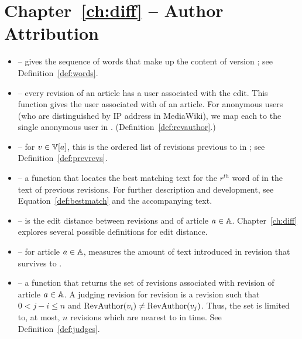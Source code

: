 \section{Chapter~\ref{ch:diff} -- Author Attribution}

\begin{itemize}

\item \words{\version{}} -- gives the sequence of words that make
    up the content of version \version{}; see
    Definition~\ref{def:words}.

\item \revauthor{\version{}} -- every revision of an article has
    a user associated with the edit.
    This function gives the user associated with \version{} of
    an article.
    For anonymous users (who are distinguished by IP address in
    MediaWiki), we map each to the single anonymous user in \users.
    (Definition~\ref{def:revauthor}.)

\item \prevrevs{\version{}} -- for $\version{} \in \versions{a}$,
    this is the ordered list of revisions previous to \version{}
    in ; see Definition~\ref{def:prevrevs}.

\item {} -- a function
    that locates the best matching text for the $r^{th}$ word of
     in the text of previous revisions.
    For further description and development, see
    Equation~\ref{def:bestmatch} and the accompanying text.

\item {} -- is the edit distance between revisions
     and  of article $a \in \mathbb{A}$.
    Chapter~\ref{ch:diff} explores several possible definitions for
    edit distance.

\item {} -- for article $a \in \mathbb{A}$, measures the
    amount of text introduced in revision 
    that survives to .

\item {} -- a function that returns the set of
     revisions associated with revision 
    of article $a \in \mathbb{A}$.
    A judging revision for revision  is a revision 
    such that $0 < j - i \le n$ and
    $\mathrm{RevAuthor}(v_{i}) \not= \mathrm{RevAuthor}(v_{j})$.
    Thus, the set is limited to, at most, $n$ revisions which are nearest
    to  in time.  See Definition~\ref{def:judges}.

\end{itemize}

